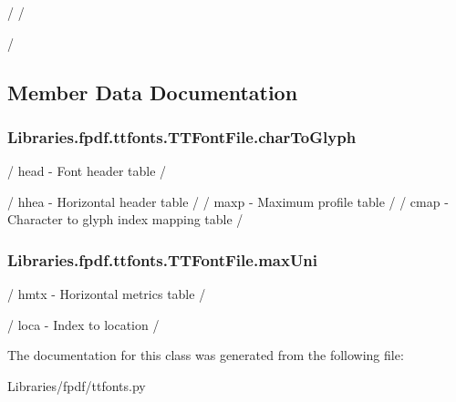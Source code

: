 / / 

/ 

\subsection{Member Data Documentation}
\subsubsection[{\texorpdfstring{char\+To\+Glyph}{charToGlyph}}]{\setlength{\rightskip}{0pt plus 5cm}Libraries.\+fpdf.\+ttfonts.\+T\+T\+Font\+File.\+char\+To\+Glyph}\hypertarget{class_libraries_1_1fpdf_1_1ttfonts_1_1_t_t_font_file_af69ad0ac8c81467ff75c251c0637e632}{}\label{class_libraries_1_1fpdf_1_1ttfonts_1_1_t_t_font_file_af69ad0ac8c81467ff75c251c0637e632}


/ head -\/ Font header table / 

/ hhea -\/ Horizontal header table / / maxp -\/ Maximum profile table / / cmap -\/ Character to glyph index mapping table / 
\subsubsection[{\texorpdfstring{max\+Uni}{maxUni}}]{\setlength{\rightskip}{0pt plus 5cm}Libraries.\+fpdf.\+ttfonts.\+T\+T\+Font\+File.\+max\+Uni}\hypertarget{class_libraries_1_1fpdf_1_1ttfonts_1_1_t_t_font_file_a908fefbd74a84926ca42c0bf0a74cfdf}{}\label{class_libraries_1_1fpdf_1_1ttfonts_1_1_t_t_font_file_a908fefbd74a84926ca42c0bf0a74cfdf}


/ hmtx -\/ Horizontal metrics table / 

/ loca -\/ Index to location / 

The documentation for this class was generated from the following file\+:\begin{DoxyCompactItemize}
\item 
Libraries/fpdf/ttfonts.\+py\end{DoxyCompactItemize}
